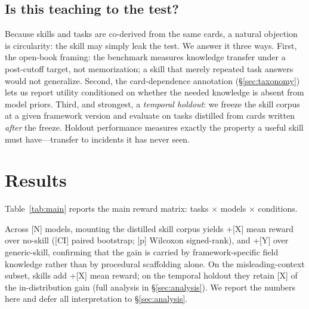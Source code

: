 \documentclass[11pt]{article}
\begin{document}
\subsection{Is this teaching to the test?}
\label{sec:teaching-to-test}

Because skills and tasks are co-derived from the same cards, a natural objection is circularity: the skill may simply leak the test.
We answer it three ways.
First, the open-book framing: the benchmark measures knowledge transfer under a post-cutoff target, not memorization; a skill that merely repeated task answers would not generalize.
Second, the card-dependence annotation (\S\ref{sec:taxonomy}) lets us report utility conditioned on whether the needed knowledge is absent from model priors.
Third, and strongest, a \emph{temporal holdout}: we freeze the skill corpus at a given framework version and evaluate on tasks distilled from cards written \emph{after} the freeze.
Holdout performance measures exactly the property a useful skill must have---transfer to incidents it has never seen.

\section{Results}
\label{sec:results}

Table~\ref{tab:main} reports the main reward matrix: tasks $\times$ models $\times$ conditions.

\begin{table}[t]
\centering
{}
\caption{Main results. Reward (median over three runs) per task, model, and condition. Summary rows report mean deltas of distilled-skill over no-skill and over generic-skill.}
\label{tab:main}
\end{table}

Across [N] models, mounting the distilled skill corpus yields +[X] mean reward over no-skill ([CI] paired bootstrap; [p] Wilcoxon signed-rank), and +[Y] over generic-skill, confirming that the gain is carried by framework-specific field knowledge rather than by procedural scaffolding alone.
On the misleading-context subset, skills add +[X] mean reward; on the temporal holdout they retain [X] of the in-distribution gain (full analysis in \S\ref{sec:analysis}).
We report the numbers here and defer all interpretation to \S\ref{sec:analysis}.
\end{document}

